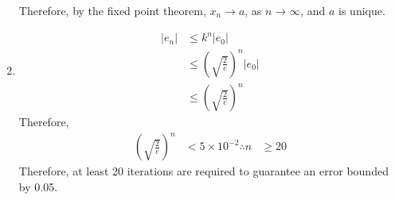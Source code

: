 \documentclass[fleqn, a4paper, 11pt, oneside]{amsart}
\theoremstyle{definition}
\theoremstyle{theorem}
\begin{document}
\begin{solution}
\begin{enumerate}[leftmargin=*]
			Therefore, by the fixed point theorem, $x_n \to a$, as $n \to \infty$, and $a$ is unique.
		\item
			\begin{align*}
				|e_n| & \le k^n |e_0|                                 \\
                                      & \le \left( \sqrt{\frac{2}{e}} \right)^n |e_0| \\
                                      & \le \left( \sqrt{\frac{2}{e}} \right)^n
			\end{align*}
			Therefore,
			\begin{align*}
				\left( \sqrt{\frac{2}{e}} \right)^n & < 5 \times 10^{-2}
				\therefore n                        & \ge 20
			\end{align*}
			Therefore, at least 20 iterations are required to guarantee an error bounded by 0.05.
	\end{enumerate}
\end{solution}
\end{document}
